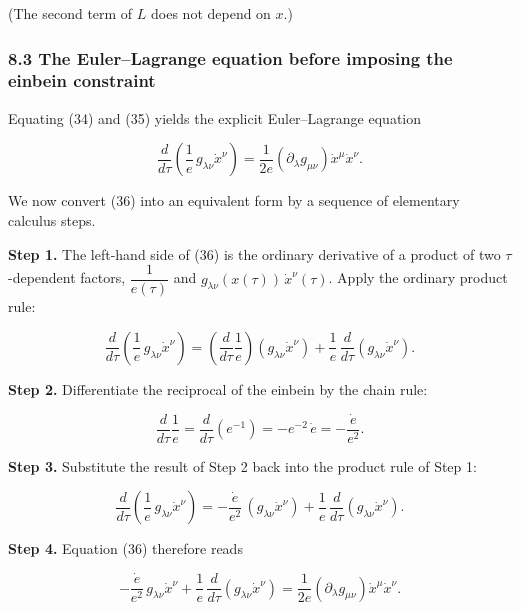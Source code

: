 \documentclass[
]{article}
\begin{document}
(The second term of \(L\) does not depend on \(x\).)

\hypertarget{the-eulerlagrange-equation-before-imposing-the-einbein-constraint}{%
\subsubsection{8.3 The Euler--Lagrange equation before imposing the
einbein
constraint}\label{the-eulerlagrange-equation-before-imposing-the-einbein-constraint}}

Equating (34) and (35) yields the explicit Euler--Lagrange equation

\[\frac{d}{d\tau} \left( \frac{1}{e}\, g_{\lambda\nu} \dot{x}^{\nu} \right) = \frac{1}{2e} \left( \partial_{\lambda} g_{\mu\nu} \right) \dot{x}^{\mu} \dot{x}^{\nu}. \tag{36}\]

We now convert (36) into an equivalent form by a sequence of elementary
calculus steps.

\textbf{Step 1.} The left-hand side of (36) is the ordinary derivative
of a product of two \(\tau\)-dependent factors, \(\dfrac{1}{e(\tau)}\)
and \(g_{\lambda\nu}(x(\tau))\, \dot{x}^{\nu}(\tau)\). Apply the
ordinary product rule:

\[\frac{d}{d\tau} \left( \frac{1}{e}\, g_{\lambda\nu} \dot{x}^{\nu} \right) = \left( \frac{d}{d\tau} \frac{1}{e} \right) \left( g_{\lambda\nu} \dot{x}^{\nu} \right) + \frac{1}{e}\, \frac{d}{d\tau} \left( g_{\lambda\nu} \dot{x}^{\nu} \right). \tag{37}\]

\textbf{Step 2.} Differentiate the reciprocal of the einbein by the
chain rule:

\[\frac{d}{d\tau} \frac{1}{e} = \frac{d}{d\tau} \left( e^{-1} \right) = - e^{-2}\, \dot{e} = - \frac{\dot{e}}{e^{2}}. \tag{38}\]

\textbf{Step 3.} Substitute the result of Step 2 back into the product
rule of Step 1:

\[\frac{d}{d\tau} \left( \frac{1}{e}\, g_{\lambda\nu} \dot{x}^{\nu} \right) = - \frac{\dot{e}}{e^{2}}\, \left( g_{\lambda\nu} \dot{x}^{\nu} \right) + \frac{1}{e}\, \frac{d}{d\tau} \left( g_{\lambda\nu} \dot{x}^{\nu} \right). \tag{39}\]

\textbf{Step 4.} Equation (36) therefore reads

\[- \frac{\dot{e}}{e^{2}}\, g_{\lambda\nu} \dot{x}^{\nu} + \frac{1}{e}\, \frac{d}{d\tau} \left( g_{\lambda\nu} \dot{x}^{\nu} \right) = \frac{1}{2e} \left( \partial_{\lambda} g_{\mu\nu} \right) \dot{x}^{\mu} \dot{x}^{\nu}. \tag{40}\]
\end{document}
